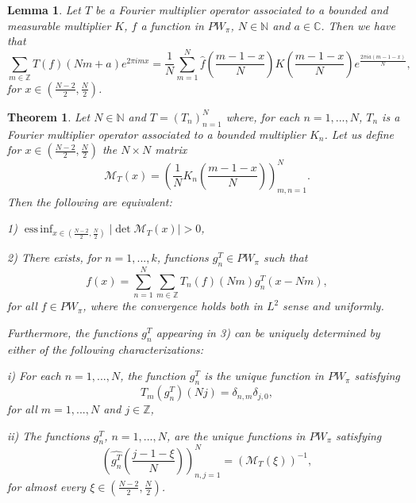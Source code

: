 \documentclass[10pt,a4paper]{amsart}
\newtheorem{theorem}{Theorem}
\newtheorem{lemma}{Lemma}
\newcommand{\C}{{\mathbb C}}
\newcommand{\N}{{\mathbb N}}
\newcommand{\Z}{{\mathbb Z}}
\newcommand{\abs}[1]{\left\vert#1\right\vert}
\DeclareMathOperator{\essinf}{ess\,inf}
\newcommand{\pa}[1]{\left(#1\right)}
\begin{document}
\begin{lemma}\label{lem2}
    Let $T$ be a Fourier multiplier operator associated to a bounded and measurable multiplier $K$, $f$ a function 
    in $PW_\pi$, $N\in\N$ and $a\in\C$. Then we have that
	$$\sum_{m\in\Z} T(f)(Nm+a) e^{2\pi i m x}
	=\frac{1}{N} \sum_{m=1}^N \widehat{f}\pa{\frac{m-1-x}{N}} K\pa{\frac{m-1-x}{N}}e^\frac{2\pi i a (m-1-x)}{N},$$
	for $x\in \pa{\frac{N-2}{2},\frac{N}{2}}$.
\end{lemma}

\begin{theorem}\label{theo}
    Let $N\in\N$ and $T=\pa{T_n}_{n=1}^N$ where, for each $n=1,...,N$, $T_n$ is a Fourier multiplier operator associated 
    to a bounded  multiplier $K_n$. Let us define for $x\in\pa{\frac{N-2}{2},\frac{N}{2}}$ the $N \times N$ matrix
	$$\mathcal{M}_T(x)=\pa{\frac{1}{N} K_n\pa{\frac{m-1-x}{N}}}_{m,n=1}^N.$$
	Then the following are equivalent:
	
%	
    1) $\essinf_{x\in \pa{\frac{N-2}{2},\frac{N}{2}}} \abs{\det \mathcal{M}_T(x)}>0$,
	
	2) There exists, for $n=1,...,k$, functions $g^T_n\in PW_\pi$ such that
	$$f(x)=\sum_{n=1}^N \sum_{m\in\Z} T_n(f)(Nm) g^T_n(x-Nm),$$
	for all $f\in PW_\pi$, where the convergence holds both in $L^2$ sense and uniformly.
	
	Furthermore, the functions $g^T_n$ appearing in 3) can be uniquely determined by either of the following 
	characterizations:
	
	i) For each $n=1,...,N$, the function $g^T_n$ is the unique function in $PW_\pi$ satisfying
	$$T_m(g^T_n)(Nj)=\delta_{n,m}\delta_{j,0},$$
	for all $m=1,...,N$ and $j\in\Z$,
	
	ii) The functions $g^T_n$, $n=1,...,N$, are the unique functions in $PW_\pi$ satisfying
	$$\pa{\widehat{g^T_n}\pa{\frac{j-1-\xi}{N}}}_{n,j=1}^N=\pa{\mathcal{M}_T(\xi)}^{-1},$$
	for almost every $\xi\in\pa{\frac{N-2}{2},\frac{N}{2}}$.
\end{theorem}
\end{document}
